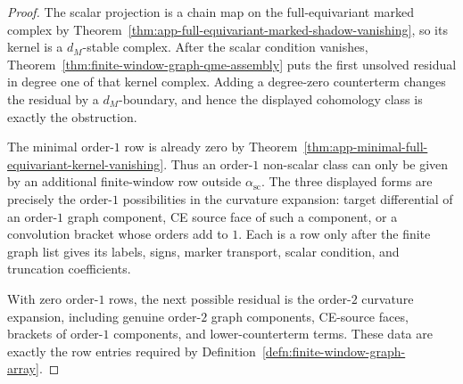 \begin{proof}
  The scalar projection is a chain map on the full-equivariant marked
  complex by Theorem~\ref{thm:app-full-equivariant-marked-shadow-vanishing},
  so its kernel is a \(d_M\)-stable complex.  After the scalar condition
  vanishes, Theorem~\ref{thm:finite-window-graph-qme-assembly} puts the
  first unsolved residual in degree one of that kernel complex.  Adding a
  degree-zero counterterm changes the residual by a \(d_M\)-boundary, and
  hence the displayed cohomology class is exactly the obstruction.

  The minimal order-\(1\) row is already zero by
  Theorem~\ref{thm:app-minimal-full-equivariant-kernel-vanishing}.  Thus an
  order-\(1\) non-scalar class can only be given by an additional
  finite-window row outside \(\alpha_{\mathrm{sc}}\).  The three displayed
  forms are precisely the order-\(1\) possibilities in the curvature
  expansion: target differential of an order-\(1\) graph component, CE
  source face of such a component, or a convolution bracket whose orders
  add to \(1\).  Each is a row only after the finite graph list gives
  its labels, signs, marker transport, scalar condition, and truncation
  coefficients.

  With zero order-\(1\) rows, the next possible residual is the
  order-\(2\) curvature expansion, including genuine order-\(2\) graph
  components, CE-source faces, brackets of order-\(1\) components, and
  lower-counterterm terms.  These data are exactly the row entries required by
  Definition~\ref{defn:finite-window-graph-array}.
\end{proof}


